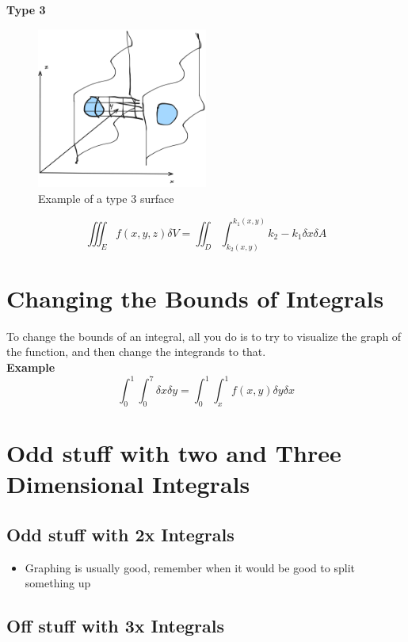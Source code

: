 \documentclass{article}
\begin{document}
\textbf{Type 3}

\begin{figure}[H]
    \centering
    \includegraphics[width=0.5\textwidth]{figures/type3surfaces.png}
    \caption{Example of a type 3 surface}
\end{figure}

$$\iiint_E f(x, y, z) \delta V = \iint_D \int_{k_2(x, y)}^{k_1(x, y)} k_2 - k_1 \delta x \delta A$$

\section{Changing the Bounds of Integrals}

To change the bounds of an integral, all you do is to try to visualize the graph of the function, and then change the integrands to that.\\
\textbf{Example}
$$\int_{0}^{1}\int_{0}^{7} \delta x \delta y = \int_{0}^{1} \int_{x}^{1} f(x, y) \delta y \delta x$$

\section{Odd stuff with two and Three Dimensional Integrals}

\subsection{Odd stuff with 2x Integrals}

\begin{itemize}
    \item Graphing is usually good, remember when it would be good to split something up
\end{itemize}

\subsection{Off stuff with 3x Integrals}
\end{document}

